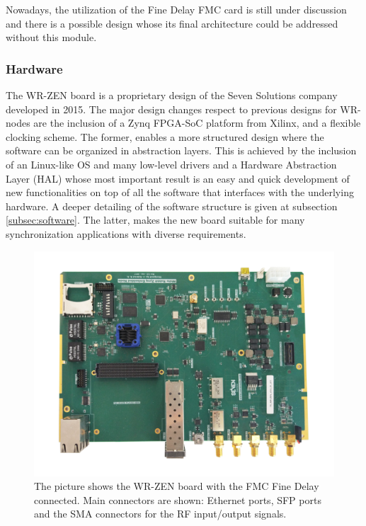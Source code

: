 Nowadays, the utilization of the Fine Delay FMC card is still under discussion and there is a possible design whose its final architecture could be addressed without this module.

\subsubsection{Hardware}
\label{subsec:hardware}

The WR-ZEN board is a proprietary design of the Seven Solutions company 
developed in 2015. The major design changes respect to previous designs for 
WR-nodes are the inclusion of a Zynq FPGA-SoC platform from Xilinx, and a 
flexible clocking scheme. The former, enables a more structured design where 
the software can be organized in abstraction layers. This is achieved by the 
inclusion of an Linux-like OS and many low-level drivers and a Hardware 
Abstraction Layer (HAL) whose most important result is an easy and quick 
development of new functionalities on top of all the software that interfaces 
with the underlying hardware. A deeper detailing of the software structure is 
given at subsection \ref{subsec:software}. The latter, makes the new board 
suitable for many synchronization applications with diverse requirements.

\begin{figure}[H]
	\centering
	\includegraphics[width=0.7\linewidth]{img/wrzenv3_scaled}
	\caption[WR-ZEN board picture]{The picture shows the WR-ZEN board with the 
	FMC Fine Delay connected. Main connectors are shown: Ethernet ports, SFP 
	ports and the SMA connectors for the RF input/output signals.}
	\label{fig:wrzen}
\end{figure}

